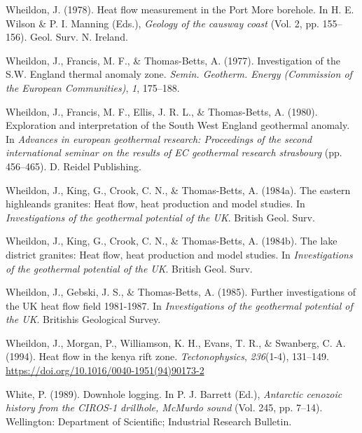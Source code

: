 \documentclass[draft,linenumbers]{agujournal2018}
\begin{document}
\leavevmode{}%
Wheildon, J. (1978). Heat flow measurement in the {Port More} borehole.
In H. E. Wilson \& P. I. Manning (Eds.), \emph{Geology of the causway
coast} (Vol. 2, pp. 155--156). Geol. Surv. N. Ireland.

\leavevmode{}%
Wheildon, J., Francis, M. F., \& Thomas-Betts, A. (1977). Investigation
of the {S.W.} England thermal anomaly zone. \emph{Semin. Geotherm.
Energy (Commission of the European Communities)}, \emph{1}, 175--188.

\leavevmode{}%
Wheildon, J., Francis, M. F., Ellis, J. R. L., \& Thomas-Betts, A.
(1980). Exploration and interpretation of the {South West England}
geothermal anomaly. In \emph{Advances in european geothermal research:
Proceedings of the second international seminar on the results of EC
geothermal research strasbourg} (pp. 456--465). D. Reidel Publishing.

\leavevmode{}%
Wheildon, J., King, G., Crook, C. N., \& Thomas-Betts, A. (1984a). The
eastern highleands granites: Heat flow, heat production and model
studies. In \emph{Investigations of the geothermal potential of the UK}.
British Geol. Surv.

\leavevmode{}%
Wheildon, J., King, G., Crook, C. N., \& Thomas-Betts, A. (1984b). The
lake district granites: Heat flow, heat production and model studies. In
\emph{Investigations of the geothermal potential of the UK}. British
Geol. Surv.

\leavevmode{}%
Wheildon, J., Gebski, J. S., \& Thomas-Betts, A. (1985). Further
investigations of the UK heat flow field 1981-1987. In
\emph{Investigations of the geothermal potential of the UK}. Britishis
Geological Survey.

\leavevmode{}%
Wheildon, J., Morgan, P., Williamson, K. H., Evans, T. R., \& Swanberg,
C. A. (1994). Heat flow in the kenya rift zone. \emph{Tectonophysics},
\emph{236}(1-4), 131--149.
\url{https://doi.org/10.1016/0040-1951(94)90173-2}

\leavevmode{}%
White, P. (1989). Downhole logging. In P. J. Barrett (Ed.),
\emph{Antarctic cenozoic history from the CIROS-1 drillhole, McMurdo
sound} (Vol. 245, pp. 7--14). Wellington: Department of Scientific;
Industrial Research Bulletin.
\end{document}
